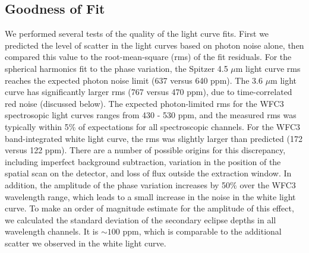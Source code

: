 \documentclass[twocolumn, trackchanges]{aastex61}
\begin{document}
\subsection{Goodness of Fit}
\label{sec:fitquality}
We performed several tests of the quality of the light curve fits.  First we
predicted the level of scatter in the light curves based on photon noise alone,
then compared this value to the root-mean-square (rms) of the fit residuals.
For the spherical harmonics fit to the phase variation, the Spitzer 4.5 $\mu$m
light curve rms reaches the expected photon noise limit (637 versus 640 ppm).
The 3.6 $\mu$m light curve has significantly larger rms (767 versus 470 ppm),
due to time-correlated red noise (discussed below). The expected photon-limited
rms for the WFC3 spectrosopic light curves ranges from 430 - 530 ppm, and the
measured rms was typically within 5\% of expectations for all spectroscopic
channels.  For the WFC3 band-integrated white light curve, the rms was slightly
larger than predicted (172 versus 122 ppm). There are a number of possible
origins for this discrepancy, including imperfect background subtraction,
variation in the position of the spatial scan on the detector, and loss of flux
outside the extraction window. In addition, the amplitude of the phase
variation increases by 50\% over the WFC3 wavelength range, which leads to a
small increase in the noise in the white light curve. To make an order of
magnitude estimate for the amplitude of this effect, we calculated the standard
deviation of the secondary eclipse depths in all wavelength channels. It is
$\sim100$ ppm, which is comparable to the additional scatter we observed in the
white light curve. 


\end{document}
